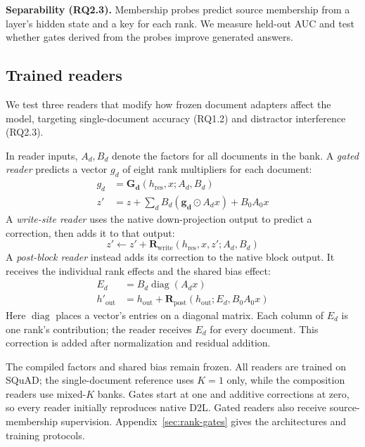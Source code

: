 \textbf{Separability (RQ2.3).} Membership probes predict source membership
from a layer's hidden state and a key for each rank. We measure held-out AUC
and test whether gates derived from the probes improve generated answers.

\subsection{Trained readers}
\label{sec:readers}

We test three readers that modify how frozen document adapters affect the model,
targeting single-document accuracy (RQ1.2) and distractor interference (RQ2.3).

In reader inputs, $A_d,B_d$ denote the factors for all documents in the bank.
A \emph{gated reader} predicts a vector $g_d$ of eight rank multipliers
for each document:
\begin{equation}
\begin{aligned}
g_d&=\boldsymbol{G_d}(h_{\mathrm{res}},x;A_d,B_d)\\
z'&=z+\sum_d B_d(\boldsymbol{g_d\odot} A_dx)+B_0A_0x
\end{aligned}
\label{eq:gated-reader}
\end{equation}
A \emph{write-site reader} uses the native down-projection output to predict
a correction, then adds it to that output:
\begin{equation}
z'\leftarrow z'+\boldsymbol{R_{\mathrm{write}}}(h_{\mathrm{res}},x,z';A_d,B_d)
\label{eq:write-site-reader}
\end{equation}
A \emph{post-block reader} instead adds its correction to the native block
output. It receives the individual rank effects and the shared bias effect:
\begin{equation}
\begin{aligned}
E_d&=B_d\operatorname{diag}(A_dx)\\
h'_{\mathrm{out}}&=h_{\mathrm{out}}+\boldsymbol{R_{\mathrm{post}}}(h_{\mathrm{out}};E_d,B_0A_0x)
\end{aligned}
\label{eq:post-block-reader}
\end{equation}
Here $\operatorname{diag}$ places a vector's entries on a diagonal matrix.
Each column of $E_d$ is one rank's contribution; the reader receives $E_d$
for every document.
This correction is added after normalization and residual addition.

The compiled factors and shared bias remain frozen. All readers are trained on
SQuAD; the single-document reference uses $K=1$ only, while the composition
readers use mixed-$K$ banks. Gates start at one and additive corrections at
zero, so every reader initially reproduces native D2L. Gated readers also
receive source-membership supervision. Appendix~\ref{sec:rank-gates} gives the
architectures and training protocols.

